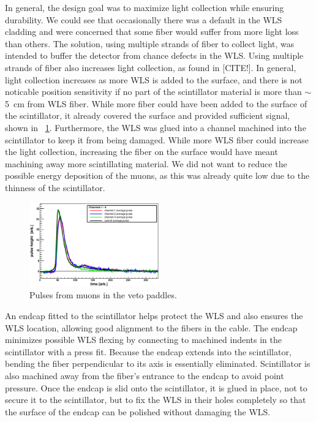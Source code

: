 In general, the design goal was to maximize light collection while ensuring durability.  We could see that occasionally there was a default in the WLS cladding and were concerned that some fiber would suffer from more light loss than others.  The solution, using multiple strands of fiber to collect light, was intended to buffer the detector from chance defects in the WLS.  Using multiple strands of fiber also increases light collection, as found in [CITE!].  In general, light collection increases as more WLS is added to the surface, and there is not noticable position sensitivity if no part of the scintillator material is more than $\sim$5~cm from WLS fiber.  While more fiber could have been added to the surface of the scintillator, it already covered the surface and provided sufficient signal, shown in {\fig}~\ref{fig:vetoSignal}.  Furthermore, the WLS was glued into a channel machined into the scintillator to keep it from being damaged.  While more WLS fiber could increase the light collection, increasing the fiber on the surface would have meant machining away more scintillating material.  We did not want to reduce the possible energy deposition of the muons, as this was already quite low due to the thinness of the scintillator.
\begin{figure}[htp]
\centering
\includegraphics[width=0.5\textwidth]{figures/PulseChan_1_4.eps}
\caption{Pulses from muons in the veto paddles.}
\label{fig:vetoSignal}
\end{figure}


An endcap fitted to the scintillator helps protect the WLS and also ensures the WLS location, allowing good alignment to the fibers in the cable.  The endcap minimizes possible WLS flexing by connecting to machined indents in the scintillator with a press fit.  Because the endcap extends into the scintillator, bending the fiber perpendicular to its axis is essentially eliminated.  Scintillator is also machined away from the fiber's entrance to the endcap to avoid point pressure.  Once the endcap is slid onto the scintillator, it is glued in place, not to secure it to the scintillator, but to fix the WLS in their holes completely so that the surface of the endcap can be polished without damaging the WLS.

